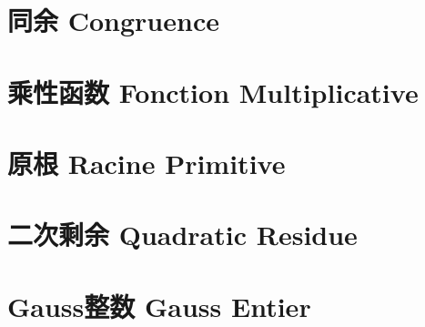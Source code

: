 \documentclass[12pt, a4paper, oneside]{ctexbook}
\begin{document}
  \section{同余 Congruence}
  \section{乘性函数 Fonction Multiplicative}
  \section{原根 Racine Primitive}
  \section{二次剩余 Quadratic Residue}
  \section{Gauss整数 Gauss Entier}







\ifx\allfiles\undefined
\end{document}
